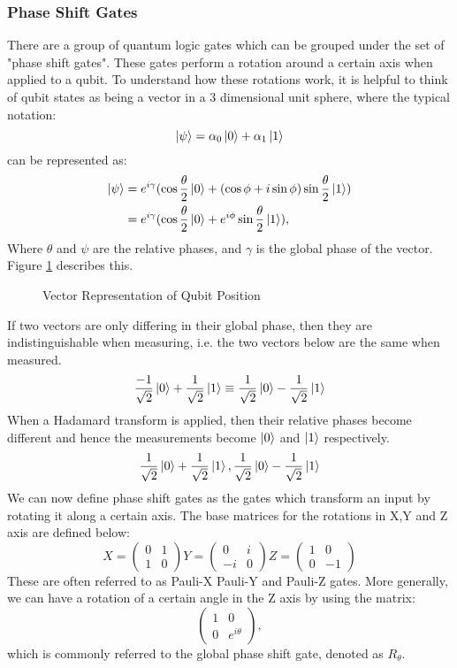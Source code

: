 \subsubsection{Phase Shift Gates}
There are a group of quantum logic gates which can be grouped under the set of "phase shift gates". These gates perform a rotation around a certain axis when applied to a qubit. To understand how these rotations work, it is helpful to think of qubit states as being a vector in a 3 dimensional unit sphere, where the typical notation: $$\ket{\psi} = \alpha_0\ket{0} + \alpha_1\ket{1}$$ can be represented as: 
\begin{align*} \ket{\psi} &= e^{i\gamma}(\cos{\frac{\theta}{2}}\ket{0} + (\cos{\phi} + i\sin{\phi})\sin{\frac{\theta}{2}}\ket{1}) \\
&= e^{i\gamma}(\cos{\frac{\theta}{2}}\ket{0} + e^{i\phi}\sin{\frac{\theta}{2}}\ket{1}),
\end{align*}
Where $\theta$ and $\psi$ are the relative phases, and $\gamma$ is the global phase of the vector. Figure \ref{fig:3Dvector} describes this. 
\begin{figure}[!htb]
\centering
\resizebox{7cm}{!}{}
\caption{Vector Representation of Qubit Position}
\label{fig:3Dvector}
\end{figure}
If two vectors are only differing in their global phase, then they are indistinguishable when measuring, i.e. the two vectors below are the same when measured. $$\frac{-1}{\sqrt{2}}\ket{0} + \frac{1}{\sqrt{2}}\ket{1} \equiv \frac{1}{\sqrt{2}}\ket{0} - \frac{1}{\sqrt{2}}\ket{1}$$ When a Hadamard transform is applied, then their relative phases become different and hence the measurements become $\ket{0}$ and $\ket{1}$ respectively. $$\frac{1}{\sqrt{2}}\ket{0} + \frac{1}{\sqrt{2}}\ket{1}, \frac{1}{\sqrt{2}}\ket{0} - \frac{1}{\sqrt{2}}\ket{1}$$  We can now define phase shift gates as the gates which transform an input by rotating it along a certain axis. The base matrices for the rotations in X,Y and Z axis are defined below:
$$X = \begin{pmatrix} 0 & 1 \\ 1 & 0 \end{pmatrix} Y = \begin{pmatrix} 0 & i \\ -i & 0 \end{pmatrix} Z = \begin{pmatrix} 1 & 0 \\ 0 & -1 \end{pmatrix}$$
These are often referred to as Pauli-X Pauli-Y and Pauli-Z gates. More generally, we can have a rotation of a certain angle in the Z axis by using the matrix: $$\begin{pmatrix} 1 & 0 \\ 0 & e^{i\theta} \end{pmatrix},$$ which is commonly referred to the global phase shift gate, denoted as $R_\theta$.
